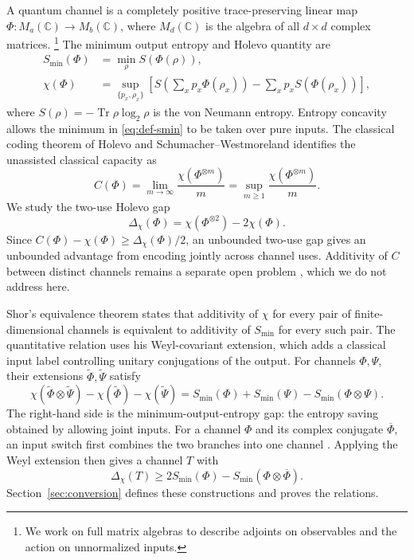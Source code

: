 \documentclass[11pt]{article}
\numberwithin{equation}{section}
\theoremstyle{boldremark}\newtheorem{remark}[theorem]{Remark}
\DeclareMathOperator{\Tr}{Tr}
\newcommand{\C}{\mathbb C}
\newcommand{\M}{M}
\newcommand{\smin}{S_{\min}}
\begin{document}
A quantum channel is a completely positive
trace-preserving linear map $\Phi:\M_a(\C)\to\M_b(\C)$, where
$\M_d(\C)$ is the algebra of all $d\times d$ complex matrices.%
\footnote{We work on full matrix algebras to describe adjoints on
observables and the action on unnormalized inputs.}
The minimum output entropy
and Holevo quantity are
\begin{align}
 \smin(\Phi)&=\min_\rho S(\Phi(\rho)),\label{eq:def-smin}\\
 \chi(\Phi)&=\sup_{\{p_x,\rho_x\}}
 \left[S\!\left(\sum_xp_x\Phi(\rho_x)\right)
       -\sum_xp_xS(\Phi(\rho_x))\right],\label{eq:def-chi}
\end{align}
where $S(\rho)=-\Tr\rho\log_2\rho$ is the von Neumann entropy.
Entropy concavity allows the minimum in \eqref{eq:def-smin} to be
taken over pure inputs.
The classical coding theorem of Holevo and Schumacher--Westmoreland
\cite{Holevo,SW} identifies the unassisted classical capacity as
\begin{equation}
 C(\Phi)=\lim_{m\to\infty}\frac{\chi(\Phi^{\otimes m})}{m}
        =\sup_{m\ge1}\frac{\chi(\Phi^{\otimes m})}{m}.
 \label{eq:capacity}
\end{equation}
We study the two-use Holevo gap
\begin{equation}
 \Delta_\chi(\Phi)=\chi(\Phi^{\otimes2})-2\chi(\Phi).
 \label{eq:def-gap}
\end{equation}
Since $C(\Phi)-\chi(\Phi)\ge\Delta_\chi(\Phi)/2$, an unbounded two-use gap gives
an unbounded advantage from encoding jointly across channel uses. Additivity of
$C$ between distinct channels remains a separate open problem
\cite[Section~1.3]{LW}, which we do not address here.

Shor's equivalence theorem \cite{Shor} states that additivity of $\chi$
for every pair of finite-dimensional channels is equivalent to
additivity of $\smin$ for every such pair. The quantitative relation
uses his Weyl-covariant extension, which adds a classical input label
controlling unitary conjugations of the output. For channels $\Phi,\Psi$,
their extensions $\widetilde\Phi,\widetilde\Psi$ satisfy
\[
 \chi(\widetilde\Phi\otimes\widetilde\Psi)
 -\chi(\widetilde\Phi)-\chi(\widetilde\Psi)
 =\smin(\Phi)+\smin(\Psi)-\smin(\Phi\otimes\Psi).
\]
The right-hand side is the minimum-output-entropy gap: the entropy
saving obtained by allowing joint inputs. For a channel $\Phi$ and its
complex conjugate $\overline\Phi$, an input switch first combines the
two branches into one channel \cite{FW}. Applying the Weyl extension
then gives a channel $T$ with
\[
 \Delta_\chi(T)\ge2\smin(\Phi)-\smin(\Phi\otimes\overline\Phi).
\]
Section~\ref{sec:conversion} defines these constructions and proves the
relations.
\end{document}
